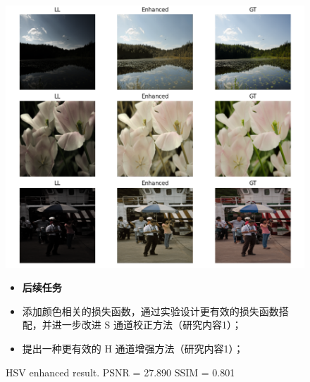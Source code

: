 \documentclass[CJK,aspectratio=169]{beamer}  %
\begin{document}
	\begin{frame}
		\begin{figure}
		\centering			
			\begin{minipage}{.45\columnwidth}
				\setlength{\abovecaptionskip}{-0.05cm}
				\centering
				\includegraphics[width=\textwidth]{picture/LLIE/Experiment/myplot_LAN1}
				\caption*{
					\tiny HSV enhanced result. PSNR = 27.890 SSIM = 0.801
				}
			\end{minipage}
			\begin{minipage}{.47\columnwidth}
				\begin{itemize}
					\item \textbf{后续任务}
					
					\vspace{.3cm}
					
					\item[\checkmark] 
					 \yahei 添加颜色相关的损失函数，通过实验设计更有效的损失函数搭配，并进一步改进 S 通道校正方法（研究内容1）；
					
					\vspace{.3cm}
					\item[\checkmark] 
					 \yahei 提出一种更有效的 H 通道增强方法（研究内容1）；
					
					

\end{itemize}
\end{minipage}
\end{figure}
\end{frame}
\end{document}
